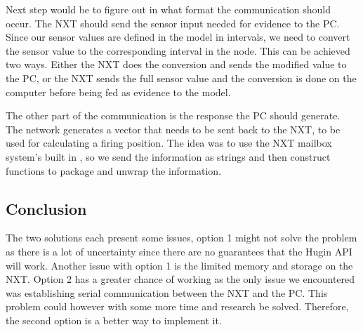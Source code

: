 Next step would be to figure out in what format the communication should occur.
The NXT should send the sensor input needed for evidence to the PC. Since our
sensor values are defined in the model in intervals, we need to convert the
sensor value to the corresponding interval in the node. This can be achieved two ways. Either
the NXT does the conversion and sends the modified value to the PC, or the NXT
sends the full sensor value and the conversion is done on the computer before
being fed as evidence to the model.\nl

The other part of the communication is the response the PC should generate. The
network generates a vector that needs to be sent back to the NXT, to be used for
calculating a firing position. The idea was to use the NXT mailbox system's
built in , so we send the information as strings and then
construct functions to package and unwrap the information.

\subsection{Conclusion}
The two solutions each present some issues, option 1 might not solve the problem
as there is a lot of uncertainty since there are no guarantees that the Hugin
API will work. Another issue with option 1 is the limited memory and storage on
the NXT. Option 2 has a greater chance of working as the only issue we
encountered was establishing serial communication between the NXT and the PC.
This problem could however with some more time and research be solved.
Therefore, the second option is a better way to implement it. 


